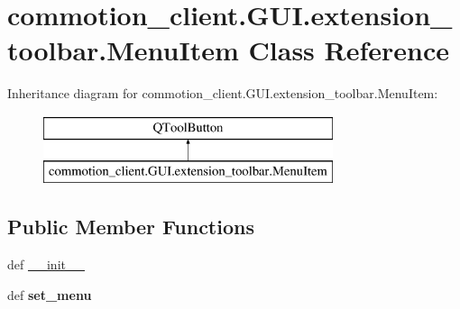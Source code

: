 \hypertarget{classcommotion__client_1_1GUI_1_1extension__toolbar_1_1MenuItem}{\section{commotion\+\_\+client.\+G\+U\+I.\+extension\+\_\+toolbar.\+Menu\+Item Class Reference}
\label{classcommotion__client_1_1GUI_1_1extension__toolbar_1_1MenuItem}
}
Inheritance diagram for commotion\+\_\+client.\+G\+U\+I.\+extension\+\_\+toolbar.\+Menu\+Item\+:\begin{figure}[H]
\begin{center}
\leavevmode
\includegraphics[height=2.000000cm]{classcommotion__client_1_1GUI_1_1extension__toolbar_1_1MenuItem}
\end{center}
\end{figure}
\subsection*{Public Member Functions}
\begin{DoxyCompactItemize}
\item 
def \hyperlink{classcommotion__client_1_1GUI_1_1extension__toolbar_1_1MenuItem_a111f98709fa79a9be8bdeed5722a9b69}{\+\_\+\+\_\+init\+\_\+\+\_\+}
\item 
\hypertarget{classcommotion__client_1_1GUI_1_1extension__toolbar_1_1MenuItem_a59af7fe77b05243a1ca6a4821565d8f2}{def {\bfseries set\+\_\+menu}}\label{classcommotion__client_1_1GUI_1_1extension__toolbar_1_1MenuItem_a59af7fe77b05243a1ca6a4821565d8f2}

\end{DoxyCompactItemize}
